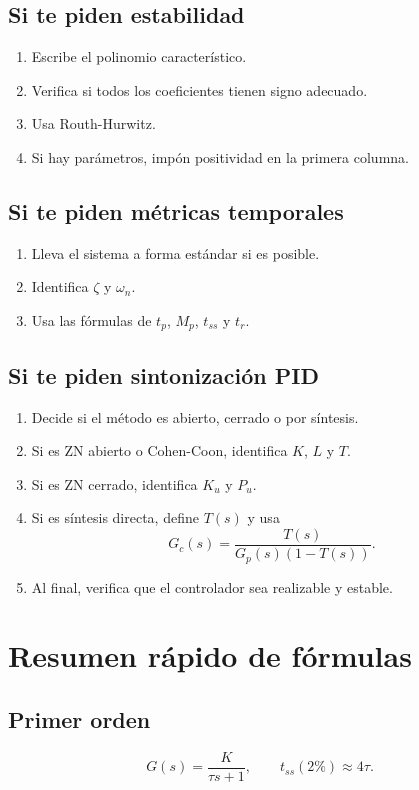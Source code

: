 \documentclass[11pt]{article}
\begin{document}
\subsection{Si te piden estabilidad}
\begin{enumerate}[label=\arabic*.]
\item Escribe el polinomio caracter\'istico.
\item Verifica si todos los coeficientes tienen signo adecuado.
\item Usa Routh-Hurwitz.
\item Si hay par\'ametros, imp\'on positividad en la primera columna.
\end{enumerate}

\subsection{Si te piden m\'etricas temporales}
\begin{enumerate}[label=\arabic*.]
\item Lleva el sistema a forma est\'andar si es posible.
\item Identifica $\zeta$ y $\omega_n$.
\item Usa las f\'ormulas de $t_p$, $M_p$, $t_{ss}$ y $t_r$.
\end{enumerate}

\subsection{Si te piden sintonizaci\'on PID}
\begin{enumerate}[label=\arabic*.]
\item Decide si el m\'etodo es abierto, cerrado o por s\'intesis.
\item Si es ZN abierto o Cohen-Coon, identifica $K$, $L$ y $T$.
\item Si es ZN cerrado, identifica $K_u$ y $P_u$.
\item Si es s\'intesis directa, define $T(s)$ y usa
\[
G_c(s)=\frac{T(s)}{G_p(s)(1-T(s))}.
\]
\item Al final, verifica que el controlador sea realizable y estable.
\end{enumerate}

\section{Resumen r\'apido de f\'ormulas}
\subsection{Primer orden}
\[
G(s)=\frac{K}{\tau s+1},\qquad
t_{ss}(2\%)\approx 4\tau.
\]
\end{document}
